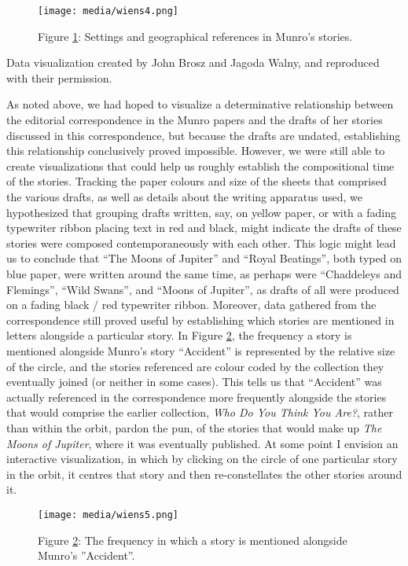 \documentclass{article}
\begin{document}
\begin{figure}[t]
    \centering
    \texttt{[image: media/wiens4.png]}
    \caption{Figure \ref{fig:wiens4}: Settings and geographical references in Munro's stories.}
    \label{fig:wiens4}
\end{figure}

Data visualization created by John Brosz and Jagoda Walny, and reproduced with their permission.

As noted above, we had hoped to visualize a determinative relationship
between the editorial correspondence in the Munro papers and the drafts
of her stories discussed in this correspondence, but because the drafts
are undated, establishing this relationship conclusively proved
impossible. However, we were still able to create visualizations that
could help us roughly establish the compositional time of the stories.
Tracking the paper colours and size of the sheets that comprised the
various drafts, as well as details about the writing apparatus used, we
hypothesized that grouping drafts written, say, on yellow paper, or with
a fading typewriter ribbon placing text in red and black, might indicate
the drafts of these stories were composed contemporaneously with each
other. This logic might lead us to conclude that ``The Moons of
Jupiter'' and ``Royal Beatings'', both typed on blue paper, were written
around the same time, as perhaps were ``Chaddeleys and Flemings'',
``Wild Swans'', and ``Moons of Jupiter'', as drafts of all were produced
on a fading black / red typewriter ribbon. Moreover, data gathered from
the correspondence still proved useful by establishing which stories are
mentioned in letters alongside a particular story. In Figure \ref{fig:wiens5}, the
frequency a story is mentioned alongside Munro's story ``Accident'' is
represented by the relative size of the circle, and the stories
referenced are colour coded by the collection they eventually joined (or
neither in some cases). This tells us that ``Accident'' was actually
referenced in the correspondence more frequently alongside the stories
that would comprise the earlier collection, \emph{Who Do You Think You
Are?}, rather than within the orbit, pardon the pun, of the stories that
would make up \emph{The Moons of Jupiter}, where it was eventually
published. At some point I envision an interactive visualization, in
which by clicking on the circle of one particular story in the orbit, it
centres that story and then re-constellates the other stories around it.

\begin{figure}[t]
    \centering
    \texttt{[image: media/wiens5.png]}
    \caption{Figure \ref{fig:wiens5}: The frequency in which a story is mentioned alongside Munro's ''Accident''.}
    \label{fig:wiens5}
\end{figure}
\end{document}
